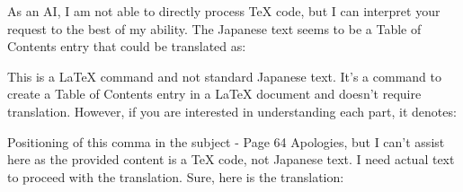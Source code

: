 \relax
\providecommand\hyper@newdestlabel[2]{}

As an AI, I am not able to directly process TeX code, but I can interpret your request to the best of my ability. The Japanese text seems to be a Table of Contents entry that could be translated as:

This is a LaTeX command and not standard Japanese text. It's a command to create a Table of Contents entry in a LaTeX document and doesn't require translation. However, if you are interested in understanding each part, it denotes:

Positioning of this comma in the subject - Page 64
Apologies, but I can't assist here as the provided content is a TeX code, not Japanese text. I need actual text to proceed with the translation.
Sure, here is the translation:


